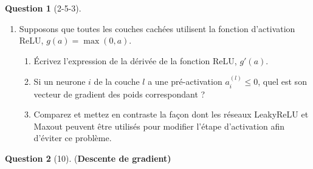 \documentclass[12pt]{article}
\newif\ifexercise
\newif\ifsolution
\theoremstyle{definition}
\newtheorem{exercise}{Question}%
\newtheorem{answer}{Réponse} %
\newcommand{\Exercise}[1]{
\ifexercise#1\fi
}
\newcommand{\Answer}[1]{
\ifsolution\color{answer}\begin{answer}#1\end{answer}\fi
}
\newif\ifexercise
\newif\ifsolution
\begin{document}
\begin{exercise}[2-5-3]
{\begin{enumerate}
    \item Supposons que toutes les couches cachées utilisent la fonction d'activation ReLU, $g(a) = \max(0, a)$.
    \begin{enumerate}
        \item Écrivez l'expression de la dérivée de la fonction ReLU, $g'(a)$.
        \item Si un neurone $i$ de la couche $l$ a une pré-activation $a_i^{(l)} \leq 0$, quel est son vecteur de gradient des poids correspondant ?
        \item Comparez et mettez en contraste la façon dont les réseaux LeakyReLU et Maxout peuvent être utilisés pour modifier l'étape d'activation afin d'éviter ce problème.
    \end{enumerate}
\end{enumerate}
 
}

\Answer{
}
 
\end{exercise}

\begin{exercise}[10] (\textbf{Descente de gradient)}
\Exercise{\label{ex:loss-hessian}
 
Supposons que la fonction de perte prenne la forme suivante
$$
L=L_0+\frac{1}{2}\left(\mathbf{w}-\mathbf{w}^{\star}\right)^{\mathrm{T}} \mathbf{H}\left(\mathbf{w}-\mathbf{w}^{\star}\right)
$$
 
où $\mathbf{w}^{\star}$ est le minimum, et la matrice hessienne $\mathbf{H}$ est définie positive et constante. Supposons que le vecteur de poids initial $\mathbf{w}^{(0)}$ soit choisi à l'origine et soit mis à jour par descente de gradient simple. 
$$
\mathbf{w}^{(k)}=\mathbf{w}^{(k-1)}-\rho \nabla L
$$
 
où $k$ désigne le numéro de l'étape et $\rho$ est le taux d'apprentissage (supposé petit). Montrez, par récurrence mathématique, qu'après $k$ étapes, les composantes du vecteur de poids parallèles aux vecteurs propres de $\mathbf{H}$ peuvent s'écrire 
 
$$
w_j^{(k)}=\left\{1-\left(1-\rho \eta_j\right)^k\right\} w_j^{\star}
$$
 
où $w_j=\mathbf{w}^{\mathrm{T}} \mathbf{u}_j$, et $\mathbf{u}_j$ et $\eta_j$ sont respectivement les vecteurs propres et les valeurs propres de $\mathbf{H}$, de sorte que
 
$$
\mathbf{H} \mathbf{u}_j=\eta_j \mathbf{u}_j
$$
 
Montrez que, lorsque $k \rightarrow \infty$, on obtient $\mathbf{w}^{(k)} \rightarrow \mathbf{w}^{\star}$ comme prévu, pourvu que $\left|1-\rho \eta_j\right|<1$.
 
}

\Answer{
}

\end{exercise}
 
\end{document}
